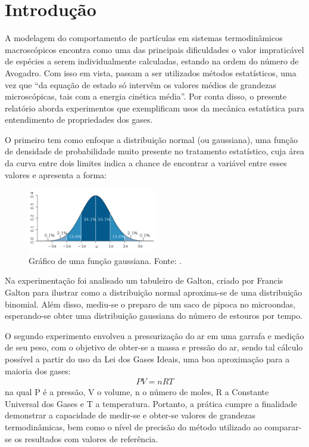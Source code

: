 \section{Introdução}
A modelagem do comportamento de partículas em sistemas termodinâmicos macroscópicos encontra como uma das principais dificuldades o valor impraticável de espécies a serem individualmente calculadas, estando na ordem do número de Avogadro. Com isso em vista, passam a ser utilizados métodos estatísticos, uma vez que “da equação de estado só intervêm os valores médios de grandezas microscópicas, tais com a energia cinética média”\cite{Nussenzveig_2014}. Por conta disso, o presente relatório aborda experimentos que exemplificam usos da mecânica estatística para entendimento de propriedades dos gases.

O primeiro tem como enfoque a distribuição normal (ou gaussiana), uma função de densidade de probabilidade muito presente no tratamento estatístico, cuja área da curva entre dois limites indica a chance de encontrar a variável entre esses valores\cite{Gaussiana} e apresenta a forma:
\begin{figure}[H]
    \centering
    \includegraphics[width=0.5\textwidth]{fig/normal.png}
    \caption{Gráfico de uma função gaussiana. Fonte: \cite{Gaussiana}.}
    \label{fig:grafGaussiana}
\end{figure}

Na experimentação foi analisado um tabuleiro de Galton, criado por Francis Galton para ilustrar como a distribuição normal aproxima-se de uma distribuição binomial. Além disso, mediu-se o preparo de um saco de pipoca no microondas, esperando-se obter uma distribuição gaussiana do número de estouros por tempo.

O segundo experimento envolveu a pressurização do ar em uma garrafa e medição de seu peso, com o objetivo de obter-se a massa e pressão do ar, sendo tal cálculo possível a partir do uso da Lei dos Gases Ideais, uma boa aproximação para a maioria dos gases\cite{Nussenzveig_2014}:
\begin{align}
    PV = nRT
\end{align}
na qual P é a pressão, V o volume, n o número de moles, R a Constante Universal dos Gases e T a temperatura. Portanto, a prática cumpre a finalidade demonstrar a capacidade de medir-se e obter-se valores de grandezas termodinâmicas, bem como o nível de precisão do método utilizado ao comparar-se os resultados com valores de referência.

